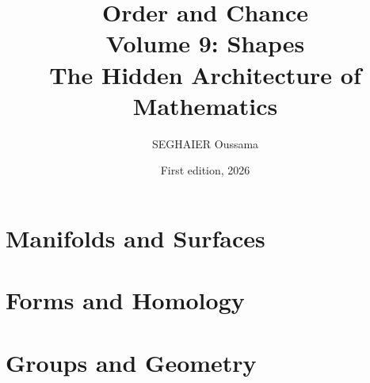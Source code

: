 \documentclass[11pt,openany]{book}
\title{\Huge\textbf{Order and Chance}\\[0.4em]\LARGE Volume 9: Shapes\\[0.6em]
\Large The Hidden Architecture of Mathematics}
\author{SEGHAIER Oussama}
\date{First edition, 2026}
\begin{document}
\frontmatter
\makecover
\maketitle

\tableofcontents

\mainmatter

\part{Manifolds and Surfaces}


\part{Forms and Homology}




\part{Groups and Geometry}






\appendix














\end{document}

